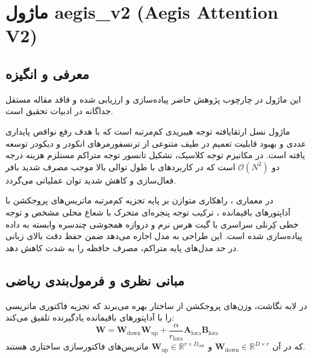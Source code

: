 \section{ماژول aegis\_v2 (Aegis Attention V2)}
\label{sec:module_aegis_v2}

\subsection{معرفی و انگیزه}
این ماژول در چارچوب پژوهش حاضر پیاده‌سازی و ارزیابی شده و فاقد مقاله مستقل جداگانه در ادبیات تحقیق است.

ماژول  نسل ارتقایافته توجه هیبریدی کم‌مرتبه است که با هدف رفع نواقص پایداری عددی و بهبود قابلیت تعمیم در طیف متنوعی از ترنسفورمرهای انکودر و دیکودر توسعه یافته است. در مکانیزم توجه کلاسیک، تشکیل تانسور توجه متراکم مستلزم هزینه درجه دو $\mathcal{O}(N^2)$ است که در کاربردهای با طول توالی بالا موجب مصرف شدید بافر فعال‌سازی و کاهش شدید توان عملیاتی می‌گردد.

در معماری ، راهکاری متوازن بر پایه تجزیه کم‌مرتبه ماتریس‌های پروجکشن با آداپتورهای باقیمانده ، ترکیب توجه پنجره‌ای متحرک با شعاع محلی مشخص و توجه خطی کِرنلی سراسری با گیت هرس نرم و دروازه همجوشی چندسره وابسته به داده پیاده‌سازی شده است. این طراحی به مدل اجازه می‌دهد ضمن حفظ دقت بالای زبانی در حد مدل‌های پایه متراکم، مصرف حافظه  را به شدت کاهش دهد.

\subsection{مبانی نظری و فرمول‌بندی ریاضی}
در لایه نگاشت، وزن‌های پروجکشن از ساختار  بهره می‌برند که تجزیه فاکتوری ماتریسی را با آداپتورهای باقیمانده یادگیرنده تلفیق می‌کند:
\begin{equation}
\mathbf{W} = \mathbf{W}_{\text{down}} \mathbf{W}_{\text{up}} + \frac{\alpha}{r_{\text{lora}}} \mathbf{A}_{\text{lora}} \mathbf{B}_{\text{lora}}
\end{equation}
که در آن $\mathbf{W}_{\text{down}} \in \mathbb{R}^{D \times r}$ و $\mathbf{W}_{\text{up}} \in \mathbb{R}^{r \times D_{\text{out}}}$ ماتریس‌های فاکتورسازی ساختاری هستند.

